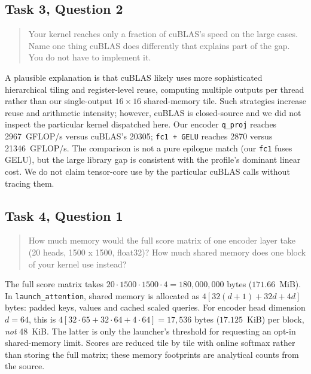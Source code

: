 \subsection{Task 3, Question 2}
\label{sec:q3}
\begin{quote}
Your kernel reaches only a fraction of cuBLAS's speed on the large cases. Name one thing cuBLAS does differently that explains part of the gap. You do not have to implement it.
\end{quote}
A plausible explanation is that cuBLAS likely uses more sophisticated
hierarchical tiling and register-level reuse, computing multiple outputs per
thread rather than our single-output $16\times16$ shared-memory tile.
Such strategies increase reuse and arithmetic intensity; however, cuBLAS is
closed-source and we did not inspect the particular kernel dispatched here.
Our encoder \texttt{q\_proj} reaches 2967~GFLOP/s versus cuBLAS's 20305;
\texttt{fc1 + GELU} reaches 2870 versus 21346~GFLOP/s.
The comparison is not a pure epilogue match (our \texttt{fc1} fuses GELU),
but the large library gap is consistent with the profile's dominant linear cost.
We do not claim tensor-core use by the particular cuBLAS calls without tracing them.

\subsection{Task 4, Question 1}
\label{sec:q4}
\begin{quote}
How much memory would the full score matrix of one encoder layer take (20 heads, 1500 x 1500, float32)? How much shared memory does one block of your kernel use instead?
\end{quote}
The full score matrix takes $20\cdot1500\cdot1500\cdot4
=180{,}000{,}000$ bytes ($171.66$~MiB).
In \texttt{launch\_attention}, shared memory is allocated as
$4[32(d+1)+32d+4d]$ bytes: padded keys, values and cached scaled queries.
For encoder head dimension $d=64$, this is
$4[32\cdot65+32\cdot64+4\cdot64]=17{,}536$ bytes
($17.125$~KiB) per block, \emph{not} 48~KiB.
The latter is only the launcher's threshold for requesting an opt-in shared-memory
limit. Scores are reduced tile by tile with online softmax rather than storing the
full matrix; these memory footprints are analytical counts from the source.

